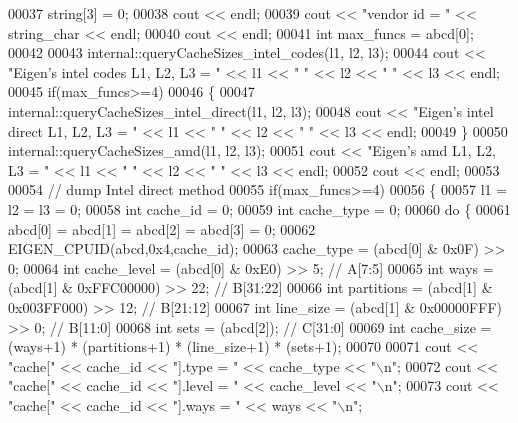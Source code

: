 \begin{DoxyCode}
00037   \textcolor{keywordtype}{string}[3] = 0;
00038   cout << endl;
00039   cout << \textcolor{stringliteral}{"vendor id = "} << string\_char << endl;
00040   cout << endl;
00041   \textcolor{keywordtype}{int} max\_funcs = abcd[0];
00042 
00043   internal::queryCacheSizes\_intel\_codes(l1, l2, l3);
00044   cout << \textcolor{stringliteral}{"Eigen's intel codes L1, L2, L3 = "} << l1 << \textcolor{stringliteral}{" "} << l2 << \textcolor{stringliteral}{" "} << l3 << endl;
00045   \textcolor{keywordflow}{if}(max\_funcs>=4)
00046   \{
00047     internal::queryCacheSizes\_intel\_direct(l1, l2, l3);
00048     cout << \textcolor{stringliteral}{"Eigen's intel direct L1, L2, L3 = "} << l1 << \textcolor{stringliteral}{" "} << l2 << \textcolor{stringliteral}{" "} << l3 << endl;
00049   \}
00050   internal::queryCacheSizes\_amd(l1, l2, l3);
00051   cout << \textcolor{stringliteral}{"Eigen's amd L1, L2, L3         = "} << l1 << \textcolor{stringliteral}{" "} << l2 << \textcolor{stringliteral}{" "} << l3 << endl;
00052   cout << endl;
00053   
00054   \textcolor{comment}{// dump Intel direct method}
00055   \textcolor{keywordflow}{if}(max\_funcs>=4)
00056   \{
00057     l1 = l2 = l3 = 0;
00058     \textcolor{keywordtype}{int} cache\_id = 0;
00059     \textcolor{keywordtype}{int} cache\_type = 0;
00060     \textcolor{keywordflow}{do} \{
00061       abcd[0] = abcd[1] = abcd[2] = abcd[3] = 0;
00062       EIGEN\_CPUID(abcd,0x4,cache\_id);
00063       cache\_type  = (abcd[0] & 0x0F) >> 0;
00064       \textcolor{keywordtype}{int} cache\_level = (abcd[0] & 0xE0) >> 5;  \textcolor{comment}{// A[7:5]}
00065       \textcolor{keywordtype}{int} ways        = (abcd[1] & 0xFFC00000) >> 22; \textcolor{comment}{// B[31:22]}
00066       \textcolor{keywordtype}{int} partitions  = (abcd[1] & 0x003FF000) >> 12; \textcolor{comment}{// B[21:12]}
00067       \textcolor{keywordtype}{int} line\_size   = (abcd[1] & 0x00000FFF) >>  0; \textcolor{comment}{// B[11:0]}
00068       \textcolor{keywordtype}{int} sets        = (abcd[2]);                    \textcolor{comment}{// C[31:0]}
00069       \textcolor{keywordtype}{int} cache\_size = (ways+1) * (partitions+1) * (line\_size+1) * (sets+1);
00070       
00071       cout << \textcolor{stringliteral}{"cache["} << cache\_id << \textcolor{stringliteral}{"].type       = "} << cache\_type << \textcolor{stringliteral}{"\(\backslash\)n"};
00072       cout << \textcolor{stringliteral}{"cache["} << cache\_id << \textcolor{stringliteral}{"].level      = "} << cache\_level << \textcolor{stringliteral}{"\(\backslash\)n"};
00073       cout << \textcolor{stringliteral}{"cache["} << cache\_id << \textcolor{stringliteral}{"].ways       = "} << ways << \textcolor{stringliteral}{"\(\backslash\)n"};

\end{DoxyCode}
